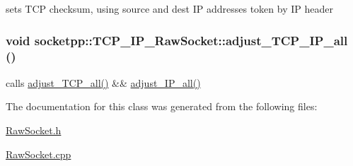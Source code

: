 sets TCP checksum, using source and dest IP addresses token by IP header 

\hypertarget{classsocketpp_1_1TCP__IP__RawSocket_dd3b21314f1768962bf399291f406768}{
\subsubsection[{adjust\_\-TCP\_\-IP\_\-all}]{\setlength{\rightskip}{0pt plus 5cm}void socketpp::TCP\_\-IP\_\-RawSocket::adjust\_\-TCP\_\-IP\_\-all ()}}
\label{classsocketpp_1_1TCP__IP__RawSocket_dd3b21314f1768962bf399291f406768}


calls \hyperlink{classsocketpp_1_1TCP__IP__RawSocket_3644327ff72d322ff809ac432f59783b}{adjust\_\-TCP\_\-all()} \&\& \hyperlink{classsocketpp_1_1IP__RawSocket_45e60510233daaa2f279d3a4706fdce5}{adjust\_\-IP\_\-all()} 



The documentation for this class was generated from the following files:\begin{CompactItemize}
\item 
\hyperlink{RawSocket_8h}{RawSocket.h}\item 
\hyperlink{RawSocket_8cpp}{RawSocket.cpp}\end{CompactItemize}
